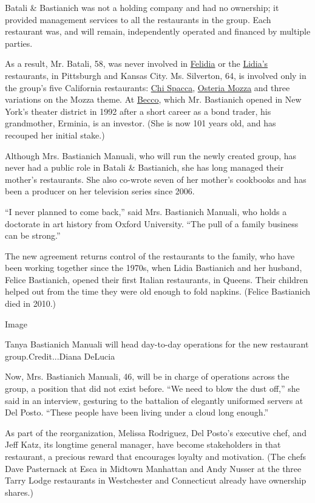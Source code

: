 Batali \& Bastianich was not a holding company and had no ownership; it
provided management services to all the restaurants in the group. Each
restaurant was, and will remain, independently operated and financed by
multiple parties.

As a result, Mr. Batali, 58, was never involved in
\href{https://felidia-nyc.com/}{Felidia} or the
\href{https://lidiasitaly.com/restaurants/}{Lidia's} restaurants, in
Pittsburgh and Kansas City. Ms. Silverton, 64, is involved only in the
group's five California restaurants: \href{https://chispacca.com/}{Chi
Spacca}, \href{https://osteriamozza.com/}{Osteria Mozza} and three
variations on the Mozza theme. At \href{https://becco-nyc.com/}{Becco},
which Mr. Bastianich opened in New York's theater district in 1992 after
a short career as a bond trader, his grandmother, Erminia, is an
investor. (She is now 101 years old, and has recouped her initial
stake.)

Although Mrs. Bastianich Manuali, who will run the newly created group,
has never had a public role in Batali \& Bastianich, she has long
managed their mother's restaurants. She also co-wrote seven of her
mother's cookbooks and has been a producer on her television series
since 2006.

``I never planned to come back,'' said Mrs. Bastianich Manuali, who
holds a doctorate in art history from Oxford University. ``The pull of a
family business can be strong.''

The new agreement returns control of the restaurants to the family, who
have been working together since the 1970s, when Lidia Bastianich and
her husband, Felice Bastianich, opened their first Italian restaurants,
in Queens. Their children helped out from the time they were old enough
to fold napkins. (Felice Bastianich died in 2010.)

Image

Tanya Bastianich Manuali will head day-to-day operations for the new
restaurant group.Credit...Diana DeLucia

Now, Mrs. Bastianich Manuali, 46, will be in charge of operations across
the group, a position that did not exist before. ``We need to blow the
dust off,'' she said in an interview, gesturing to the battalion of
elegantly uniformed servers at Del Posto. ``These people have been
living under a cloud long enough.''

As part of the reorganization, Melissa Rodriguez, Del Posto's executive
chef, and Jeff Katz, its longtime general manager, have become
stakeholders in that restaurant, a precious reward that encourages
loyalty and motivation. (The chefs Dave Pasternack at Esca in Midtown
Manhattan and Andy Nusser at the three Tarry Lodge restaurants in
Westchester and Connecticut already have ownership shares.)

